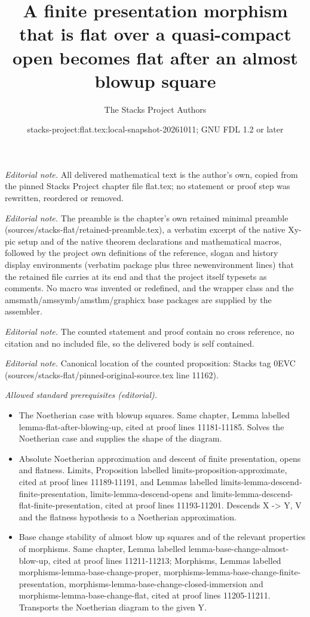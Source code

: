 \documentclass[10pt,a4paper]{amsart}
\title{A finite presentation morphism that is flat over a quasi-compact open becomes flat after an almost blowup square}
\author{The Stacks Project Authors}
\date{stacks-project:flat.tex:local-snapshot-20261011; GNU FDL 1.2 or later}
\theoremstyle{plain}
\theoremstyle{definition}
\theoremstyle{remark}
\numberwithin{equation}{subsection}
\begin{document}
\maketitle
\noindent\textit{Editorial note.} All delivered mathematical text is the author's own, copied from the pinned Stacks Project chapter file flat.tex; no statement or proof step was rewritten, reordered or removed.\par\medskip
\noindent\textit{Editorial note.} The preamble is the chapter's own retained minimal preamble (sources/stacks-flat/retained-preamble.tex), a verbatim excerpt of the native Xy-pic setup and of the native theorem declarations and mathematical macros, followed by the project own definitions of the reference, slogan and history display environments (verbatim package plus three newenvironment lines) that the retained file carries at its end and that the project itself typesets as comments. No macro was invented or redefined, and the wrapper class and the amsmath/amssymb/amsthm/graphicx base packages are supplied by the assembler.\par\medskip
\noindent\textit{Editorial note.} The counted statement and proof contain no cross reference, no citation and no included file, so the delivered body is self contained.\par\medskip
\noindent\textit{Editorial note.} Canonical location of the counted proposition: Stacks tag 0EVC (sources/stacks-flat/pinned-original-source.tex line 11162).\par\medskip
\noindent\textit{Allowed standard prerequisites (editorial).}\begin{itemize}
\item The Noetherian case with blowup squares. Same chapter, Lemma labelled lemma-flat-after-blowing-up, cited at proof lines 11181-11185. Solves the Noetherian case and supplies the shape of the diagram.
\item Absolute Noetherian approximation and descent of finite presentation, opens and flatness. Limits, Proposition labelled limits-proposition-approximate, cited at proof lines 11189-11191, and Lemmas labelled limits-lemma-descend-finite-presentation, limits-lemma-descend-opens and limits-lemma-descend-flat-finite-presentation, cited at proof lines 11193-11201. Descends X -> Y, V and the flatness hypothesis to a Noetherian approximation.
\item Base change stability of almost blow up squares and of the relevant properties of morphisms. Same chapter, Lemma labelled lemma-base-change-almost-blow-up, cited at proof lines 11211-11213; Morphisms, Lemmas labelled morphisms-lemma-base-change-proper, morphisms-lemma-base-change-finite-presentation, morphisms-lemma-base-change-closed-immersion and morphisms-lemma-base-change-flat, cited at proof lines 11205-11211. Transports the Noetherian diagram to the given Y.
\end{itemize}\medskip
\end{document}
